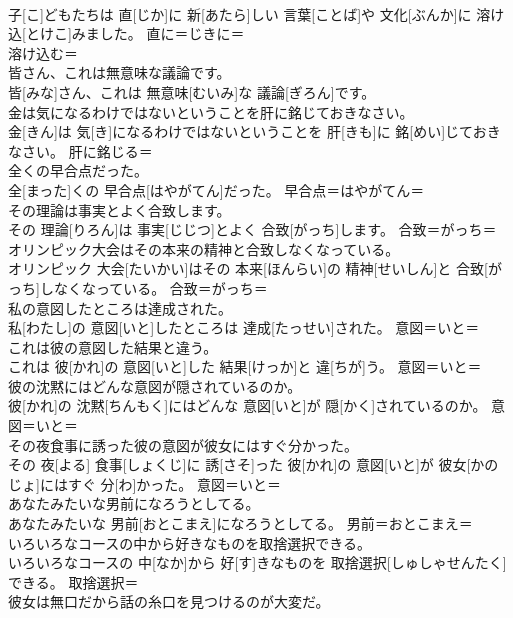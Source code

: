 \documentclass[8pt]{extreport}
\begin{document}
\begin{CJK}{UTF8}{min}
\\	子[こ]どもたちは 直[じか]に 新[あたら]しい 言葉[ことば]や 文化[ぶんか]に 溶け込[とけこ]みました。	直に＝じきに＝ 
\\	溶け込む＝ 
\\	皆さん、これは無意味な議論です。	
\\	皆[みな]さん、これは 無意味[むいみ]な 議論[ぎろん]です。	
\\	金は気になるわけではないということを肝に銘じておきなさい。	
\\	金[きん]は 気[き]になるわけではないということを 肝[きも]に 銘[めい]じておきなさい。	肝に銘じる＝ 
\\	全くの早合点だった。	
\\	全[まった]くの 早合点[はやがてん]だった。	早合点＝はやがてん＝ 
\\	その理論は事実とよく合致します。	
\\	その 理論[りろん]は 事実[じじつ]とよく 合致[がっち]します。	合致＝がっち＝ 
\\	オリンピック大会はその本来の精神と合致しなくなっている。	
\\	オリンピック 大会[たいかい]はその 本来[ほんらい]の 精神[せいしん]と 合致[がっち]しなくなっている。	合致＝がっち＝ 
\\	私の意図したところは達成された。	
\\	私[わたし]の 意図[いと]したところは 達成[たっせい]された。	意図＝いと＝ 
\\	これは彼の意図した結果と違う。	
\\	これは 彼[かれ]の 意図[いと]した 結果[けっか]と 違[ちが]う。	意図＝いと＝ 
\\	彼の沈黙にはどんな意図が隠されているのか。	
\\	彼[かれ]の 沈黙[ちんもく]にはどんな 意図[いと]が 隠[かく]されているのか。	意図＝いと＝ 
\\	その夜食事に誘った彼の意図が彼女にはすぐ分かった。	
\\	その 夜[よる] 食事[しょくじ]に 誘[さそ]った 彼[かれ]の 意図[いと]が 彼女[かのじょ]にはすぐ 分[わ]かった。	意図＝いと＝ 
\\	あなたみたいな男前になろうとしてる。	
\\	あなたみたいな 男前[おとこまえ]になろうとしてる。	男前＝おとこまえ＝ 
\\	いろいろなコースの中から好きなものを取捨選択できる。	
\\	いろいろなコースの 中[なか]から 好[す]きなものを 取捨選択[しゅしゃせんたく]できる。	取捨選択＝ 
\\	彼女は無口だから話の糸口を見つけるのが大変だ。	

\end{CJK}
\end{document}
